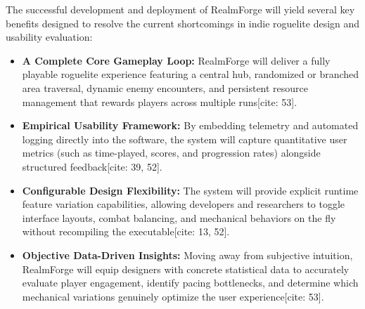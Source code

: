 The successful development and deployment of RealmForge will yield several key benefits designed to resolve the current shortcomings in indie roguelite design and usability evaluation:

\begin{itemize}
\item \textbf{A Complete Core Gameplay Loop:} RealmForge will deliver a fully playable roguelite experience featuring a central hub, randomized or branched area traversal, dynamic enemy encounters, and persistent resource management that rewards players across multiple runs[cite: 53].
\item \textbf{Empirical Usability Framework:} By embedding telemetry and automated logging directly into the software, the system will capture quantitative user metrics (such as time-played, scores, and progression rates) alongside structured feedback[cite: 39, 52].
\item \textbf{Configurable Design Flexibility:} The system will provide explicit runtime feature variation capabilities, allowing developers and researchers to toggle interface layouts, combat balancing, and mechanical behaviors on the fly without recompiling the executable[cite: 13, 52].
\item \textbf{Objective Data-Driven Insights:} Moving away from subjective intuition, RealmForge will equip designers with concrete statistical data to accurately evaluate player engagement, identify pacing bottlenecks, and determine which mechanical variations genuinely optimize the user experience[cite: 53].
\end{itemize}